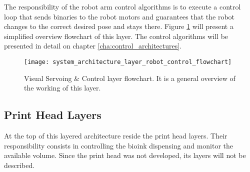 The responsibility of the robot arm control algorithms is to execute a control loop that sends binaries to the robot motors and guarantees that the robot changes to the correct desired pose and stays there. Figure \ref{fig:system_architecture_layer_robot_control_flowchart} will present a simplified overview flowchart of this layer. The control algorithms will be presented in detail on chapter \ref{cha:control_architectures}.

\begin{figure}[htbp]
	\centering
	\texttt{[image: system\_architecture\_layer\_robot\_control\_flowchart]}
	\caption[Visual Servoing \& Control layer flowchart.]{Visual Servoing \& Control layer flowchart. It is a general overview of the working of this layer.}
	\label{fig:system_architecture_layer_robot_control_flowchart}
\end{figure}



\subsection{Print Head Layers}
\label{subsec:system_architectural_printhead_layers}

At the top of this layered architecture reside the print head layers. Their responsibility consists in controlling the bioink dispensing and monitor the available volume. Since the print head was not developed, its layers will not be described.

